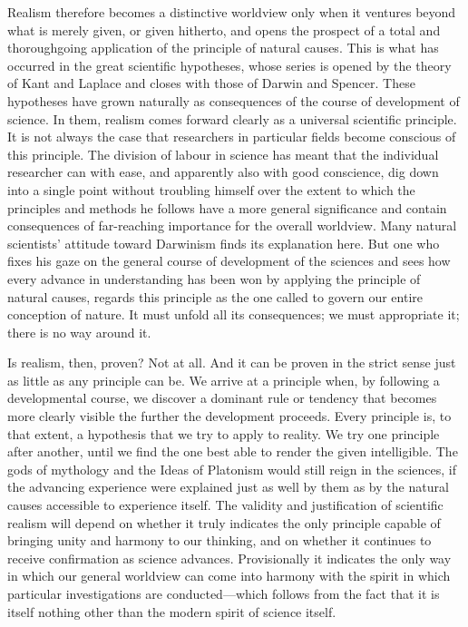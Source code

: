 \documentclass[12pt,a4paper]{article}
\begin{document}
Realism therefore becomes a distinctive worldview only when it ventures
beyond what is merely given, or given hitherto, and opens the prospect of
a total and thoroughgoing application of the principle of natural causes.
This is what has occurred in the great scientific hypotheses, whose series
is opened by the theory of Kant and Laplace and closes with those of
Darwin and Spencer. These hypotheses have grown naturally as consequences
of the course of development of science. In them, realism comes forward
clearly as a universal scientific principle. It is not always the case
that researchers in particular fields become conscious of this principle.
The division of labour in science has meant that the individual researcher
can with ease, and apparently also with good conscience, dig down into a
single point without troubling himself over the extent to which the
principles and methods he follows have a more general significance and
contain consequences of far-reaching importance for the overall worldview.
Many natural scientists' attitude toward Darwinism finds its explanation
here. But one who fixes his gaze on the general course of development of
the sciences and sees how every advance in understanding has been won by
applying the principle of natural causes, regards this principle as the
one called to govern our entire conception of nature. It must unfold all
its consequences; we must appropriate it; there is no way around it.

Is realism, then, proven? Not at all. And it can be proven in the strict
sense just as little as any principle can be. We arrive at a principle
when, by following a developmental course, we discover a dominant rule or
tendency that becomes more clearly visible the further the development
proceeds. Every principle is, to that extent, a hypothesis that we try to
apply to reality. We try one principle after another, until we find the
one best able to render the given intelligible. The gods of mythology and
the Ideas of Platonism would still reign in the sciences, if the advancing
experience were explained just as well by them as by the natural causes
accessible to experience itself. The validity and justification of
scientific realism will depend on whether it truly indicates the only
principle capable of bringing unity and harmony to our thinking, and on
whether it continues to receive confirmation as science advances.
Provisionally it indicates the only way in which our general worldview can
come into harmony with the spirit in which particular investigations are
conducted---which follows from the fact that it is itself nothing other
than the modern spirit of science itself.
\end{document}
